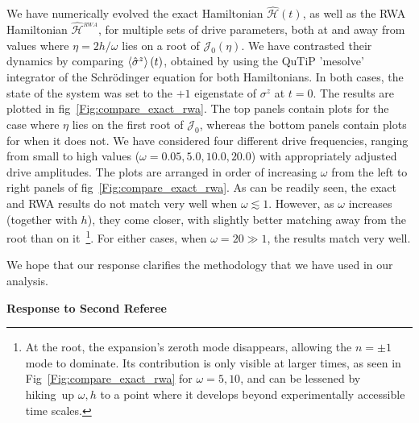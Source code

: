 \documentclass[aps,prb,reprint,showpacs,floatfix,superscriptaddress, onecolumn, nofootinbib, 9pt]{revtex4-2}
\newcommand{\ar}[1]{{\color{blue}#1}} %
\begin{document}
\begin{enumerate}
{We have numerically evolved the exact Hamiltonian $\hat{\mathcal{H}}(t)$, as well as the RWA Hamiltonian $\hat{\mathcal{H}}^{_{RWA}}$, for multiple sets of drive parameters, both at and away from values where $\eta=2h/\omega$ lies on a root of $\mathcal{J}_0(\eta)$. We have contrasted their dynamics by comparing $\expval{\hat{\sigma}^z}(t)$, obtained by using the QuTiP 'mesolve' integrator of the Schr\"odinger equation for both Hamiltonians. In both cases, the state of the system was set to the $+1$ eigenstate of $\sigma^z$ at $t=0$. The results are plotted in fig~\ref{Fig:compare_exact_rwa}. The top panels contain plots for the case where $\eta$ lies on the first root of $\mathcal{J}_0$, whereas the bottom panels contain plots for when it does not. We have considered four different drive frequencies, ranging from small to high values ($\omega = 0.05, 5.0, 10.0, 20.0$) with appropriately adjusted drive amplitudes. The plots are arranged in order of increasing $\omega$ from the left to right panels of fig~\ref{Fig:compare_exact_rwa}. As can be readily seen, the exact and RWA results do not match very well when $\omega \lesssim 1$. However, as $\omega$ increases (together with $h$), they come closer, with slightly better matching away from the root than on it~\footnote{\ar{At the root, the expansion's zeroth mode disappears, allowing the $n=\pm 1$ mode to dominate. Its contribution is only visible at larger times, as seen in Fig~\ref{Fig:compare_exact_rwa} for $\omega=5, 10$, and can be lessened by hiking up $\omega, h$ to a point where it develops beyond experimentally accessible time scales.}}. For either cases, when $\omega=20 \gg 1$, the results match very well.
    
    We hope that our response clarifies the methodology that we have used in our analysis.
    }
\end{enumerate}
  
\noindent \textbf{Response to Second Referee}
\end{document}
